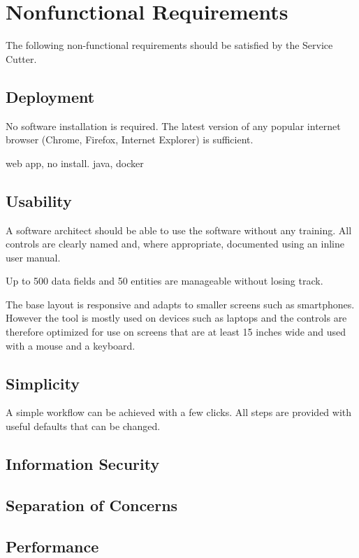 \section{Nonfunctional Requirements}

The following non-functional requirements should be satisfied by the Service Cutter.

\subsection{Deployment}

No software installation is required. The latest version of any popular internet browser (Chrome, Firefox, Internet Explorer) is sufficient.

web app, no install.
java, docker

\subsection{Usability}
\label{sec:usability}

A software architect should be able to use the software without any training. All controls are clearly named and, where appropriate, documented using an inline user manual.

Up to 500 data fields and 50 entities are manageable without losing track.

The base layout is responsive and adapts to smaller screens such as smartphones. However the tool is mostly used on devices such as laptops and the controls are therefore optimized for use on screens that are at least 15 inches wide and used with a mouse and a keyboard.

\subsection{Simplicity}

A simple workflow can be achieved with a few clicks. All steps are provided with useful defaults that can be changed.

\subsection{Information Security}

\subsection{Separation of Concerns}

\subsection{Performance}

